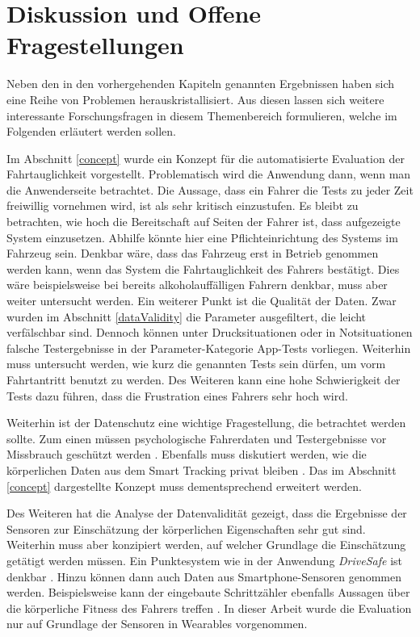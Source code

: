 \section{Diskussion und Offene Fragestellungen}
\label{openChallenges}

Neben den in den vorhergehenden Kapiteln genannten Ergebnissen haben sich eine Reihe von Problemen herauskristallisiert. Aus diesen lassen sich weitere interessante Forschungsfragen in diesem Themenbereich formulieren, welche im Folgenden erläutert werden sollen.

Im Abschnitt \ref{concept} wurde ein Konzept für die automatisierte Evaluation der Fahrtauglichkeit vorgestellt. Problematisch wird die Anwendung dann, wenn man die Anwenderseite betrachtet. Die Aussage, dass ein Fahrer die Tests zu jeder Zeit freiwillig vornehmen wird, ist als sehr kritisch einzustufen. Es bleibt zu betrachten, wie hoch die Bereitschaft auf Seiten der Fahrer ist, dass aufgezeigte System einzusetzen. Abhilfe könnte hier eine Pflichteinrichtung des Systems im Fahrzeug sein. Denkbar wäre, dass das Fahrzeug erst in Betrieb genommen werden kann, wenn das System die Fahrtauglichkeit des Fahrers bestätigt. Dies wäre beispielsweise bei bereits alkoholauffälligen Fahrern denkbar, muss aber weiter untersucht werden. Ein weiterer Punkt ist die Qualität der Daten. Zwar wurden im Abschnitt \ref{dataValidity} die Parameter ausgefiltert, die leicht verfälschbar sind. Dennoch können unter Drucksituationen oder in Notsituationen falsche Testergebnisse in der Parameter-Kategorie App-Tests vorliegen. Weiterhin muss untersucht werden, wie kurz die genannten Tests sein dürfen, um vorm Fahrtantritt benutzt zu werden. Des Weiteren kann eine hohe Schwierigkeit der Tests dazu führen, dass die Frustration eines Fahrers sehr hoch wird. 

Weiterhin ist der Datenschutz eine wichtige Fragestellung, die betrachtet werden sollte. Zum einen müssen psychologische Fahrerdaten und Testergebnisse vor Missbrauch geschützt werden \cite{beurteilungskriterienleipzig}. Ebenfalls muss diskutiert werden, wie die körperlichen Daten aus dem Smart Tracking privat bleiben \cite{securityprivacyfitnesstracking}. Das im Abschnitt \ref{concept} dargestellte Konzept muss dementsprechend erweitert werden.

Des Weiteren hat die Analyse der Datenvalidität gezeigt, dass die Ergebnisse der Sensoren zur Einschätzung der körperlichen Eigenschaften sehr gut sind. Weiterhin muss aber konzipiert werden, auf welcher Grundlage die Einschätzung getätigt werden müssen. Ein Punktesystem wie in der Anwendung \textit{DriveSafe} ist denkbar \cite{drivesafe}. Hinzu können dann auch Daten aus Smartphone-Sensoren genommen werden. Beispielsweise kann der eingebaute Schrittzähler ebenfalls Aussagen über die körperliche Fitness des Fahrers treffen \cite{validationphysicalactivitytracking,bewegungserkennungsensoren}. In dieser Arbeit wurde die Evaluation nur auf Grundlage der Sensoren in Wearables vorgenommen.


